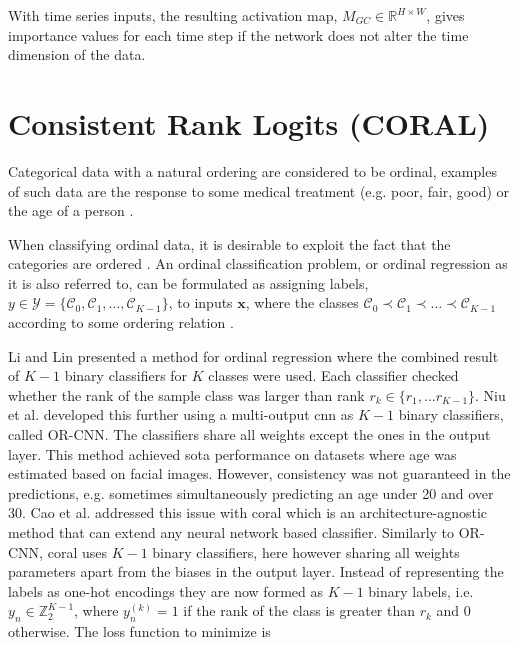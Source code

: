 With time series inputs, the resulting activation map, $M_{GC} \in \mathbb{R}^{H \times W}$, gives importance values for each time step if the network does not alter the time dimension of the data.%

\section{Consistent Rank Logits (CORAL)}
Categorical data with a natural ordering are considered to be ordinal, examples of such data are the response to some medical treatment (e.g. poor, fair, good) \cite{Agresti2007} or the age of a person \cite{Cao2019}.

When classifying ordinal data, it is desirable to exploit the fact that the categories are ordered \cite{Agresti2007}. An ordinal classification problem, or ordinal regression as it is also referred to, can be formulated as assigning labels, $y \in \mathcal{Y} = \{\mathcal{C}_0, \mathcal{C}_1, \hdots, \mathcal{C}_{K-1} \}$, to inputs $\pmb{x}$, where the classes $\mathcal{C}_0 \prec \mathcal{C}_1 \prec \hdots \prec \mathcal{C}_{K-1}$ according to some ordering relation \cite{Cao2019}.

Li and Lin \cite{Li2007} presented a method for ordinal regression where the combined result of $K-1$ binary classifiers for $K$ classes were used. Each classifier checked whether the rank of the sample class was larger than rank $r_k \in \{r_1, \hdots r_{K-1}\}$. Niu et al. \cite{Niu2016} developed this further using a multi-output \gls{cnn} as $K-1$ binary classifiers, called OR-CNN. The classifiers share all weights except the ones in the output layer. This method achieved \gls{sota} performance on datasets where age was estimated based on facial images. However, consistency was not guaranteed in the predictions, e.g. sometimes simultaneously predicting an age under 20 and over 30.
Cao et al. \cite{Cao2019} addressed this issue with \gls{coral} which is an architecture-agnostic method that can extend any neural network based classifier. Similarly to OR-CNN, \gls{coral} uses $K-1$ binary classifiers, here however sharing all weights parameters apart from the biases in the output layer. Instead of representing the labels as one-hot encodings they are now formed as $K-1$ binary labels, i.e. $y_n \in \mathbb{Z}_2^{K-1}$, where $y_n^{(k)} = 1$ if the rank of the class is greater than $r_k$ and 0 otherwise. The loss function to minimize is


